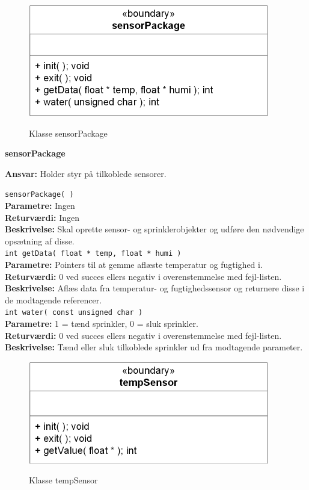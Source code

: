
\begin{figure}[htbp] \centering
{\includegraphics[scale=1.3]{filer/design/Klassediagrammer/sw_psoc_sensorPackage}}
\caption{Klasse sensorPackage}
\label{fig:sw_psoc_class_sensorPackage}
\end{figure} 

{\centering
\textbf{sensorPackage}\par
}
\textbf{Ansvar:} Holder styr på tilkoblede sensorer. \

\verb+sensorPackage( ) +\\
\textbf{Parametre:} Ingen \\
\textbf{Returværdi:} Ingen \\
\textbf{Beskrivelse:} Skal oprette sensor- og sprinklerobjekter og udføre den nødvendige opsætning af disse. \\

\verb+int getData( float * temp, float * humi )+ \\
\textbf{Parametre:} Pointers til at gemme aflæste temperatur og fugtighed i. \\
\textbf{Returværdi:} 0 ved succes ellers negativ i overenstemmelse med fejl-listen. \\
\textbf{Beskrivelse:} Aflæs data fra temperatur- og fugtighedssensor og returnere disse i de modtagende referencer. \\

\verb+int water( const unsigned char )+ \\
\textbf{Parametre:} 1 = tænd sprinkler, 0 = sluk sprinkler. \\
\textbf{Returværdi:} 0 ved succes ellers negativ i overenstemmelse med fejl-listen. \\
\textbf{Beskrivelse:} Tænd eller sluk tilkoblede sprinkler ud fra modtagende parameter. \\


\begin{figure}[htbp] \centering
{\includegraphics[scale=1.3]{filer/design/Klassediagrammer/sw_psoc_tempSensor}}
\caption{Klasse tempSensor}
\label{fig:sw_psoc_class_tempSensor}
\end{figure} 

